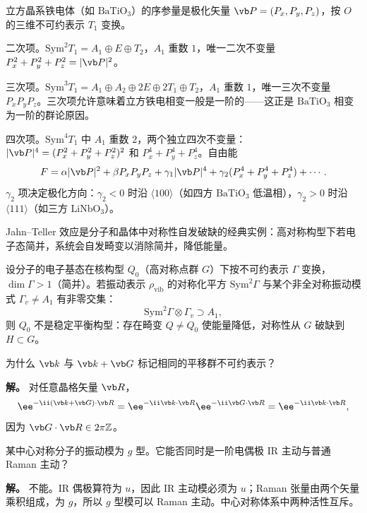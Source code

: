 \begin{example}
立方晶系铁电体（如 $\mathrm{BaTiO_3}$）的序参量是极化矢量 $\vb P=(P_x,P_y,P_z)$，按 $O$ 的三维不可约表示 $T_1$ 变换。

二次项。$\mathrm{Sym}^2 T_1=A_1\oplus E\oplus T_2$，$A_1$ 重数 $1$，唯一二次不变量 $P_x^2+P_y^2+P_z^2=|\vb P|^2$。

三次项。$\mathrm{Sym}^3 T_1=A_1\oplus A_2\oplus 2E\oplus 2T_1\oplus T_2$，$A_1$ 重数 $1$，唯一三次不变量 $P_xP_yP_z$。三次项允许意味着立方铁电相变一般是一阶的——这正是 $\mathrm{BaTiO_3}$ 相变为一阶的群论原因。

四次项。$\mathrm{Sym}^4 T_1$ 中 $A_1$ 重数 $2$，两个独立四次不变量：$|\vb P|^4=(P_x^2+P_y^2+P_z^2)^2$ 和 $P_x^4+P_y^4+P_z^4$。自由能
\[
F=\alpha|\vb P|^2+\beta P_xP_yP_z+\gamma_1|\vb P|^4+\gamma_2(P_x^4+P_y^4+P_z^4)+\cdots.
\]
$\gamma_2$ 项决定极化方向：$\gamma_2<0$ 时沿 $\langle 100\rangle$（如四方 $\mathrm{BaTiO_3}$ 低温相），$\gamma_2>0$ 时沿 $\langle 111\rangle$（如三方 $\mathrm{LiNbO_3}$）。
\end{example}


Jahn--Teller 效应是分子和晶体中对称性自发破缺的经典实例：高对称构型下若电子态简并，系统会自发畸变以消除简并，降低能量。

\begin{theorem}
\label{thm:jahn-teller}
设分子的电子基态在核构型 $Q_0$（高对称点群 $G$）下按不可约表示 $\Gamma$ 变换，$\dim\Gamma>1$（简并）。若振动表示 $\rho_{\mathrm{vib}}$ 的对称化平方 $\mathrm{Sym}^2\Gamma$ 与某个非全对称振动模式 $\Gamma_v\ne A_1$ 有非零交集：
\[
\mathrm{Sym}^2\Gamma\otimes\Gamma_v\supset A_1,
\]
则 $Q_0$ 不是稳定平衡构型：存在畸变 $Q\ne Q_0$ 使能量降低，对称性从 $G$ 破缺到 $H\subset G$。
\end{theorem}

\begin{workedexample}
为什么 $\vb k$ 与 $\vb k+\vb G$ 标记相同的平移群不可约表示？

\textbf{解。} 对任意晶格矢量 $\vb R$，
\[
\ee^{-\ii(\vb k+\vb G)\cdot\vb R}
=\ee^{-\ii\vb k\cdot\vb R}\ee^{-\ii\vb G\cdot\vb R}
=\ee^{-\ii\vb k\cdot\vb R},
\]
因为 $\vb G\cdot\vb R\in2\pi\mathbb Z$。
\end{workedexample}


\begin{workedexample}
某中心对称分子的振动模为 $g$ 型。它能否同时是一阶电偶极 IR 主动与普通 Raman 主动？

\textbf{解。} 不能。IR 偶极算符为 $u$，因此 IR 主动模必须为 $u$；Raman 张量由两个矢量乘积组成，为 $g$，所以 $g$ 型模可以 Raman 主动。中心对称体系中两种活性互斥。
\end{workedexample}


